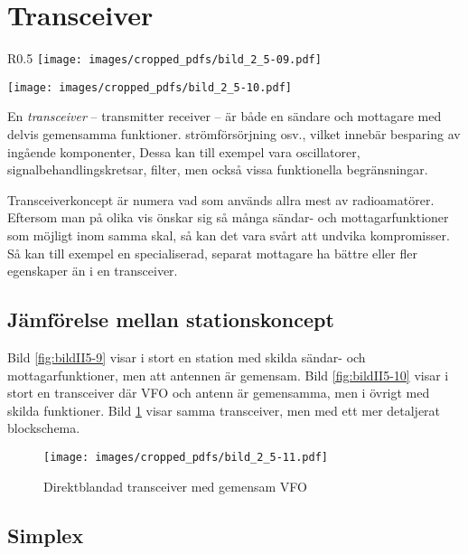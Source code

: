 \section{Transceiver}

\begin{wrapfigure}[26]{R}{0.5\textwidth}
  \texttt{[image: images/cropped\_pdfs/bild\_2\_5-09.pdf]}
  \caption{Separat sändare och mottagare}
  \label{fig:bildII5-9}

  \texttt{[image: images/cropped\_pdfs/bild\_2\_5-10.pdf]}
  \caption{Transceiver med samma VFO}
  \label{fig:bildII5-10}
\end{wrapfigure}

En \emph{transceiver} -- transmitter receiver -- är både en sändare och
mottagare med delvis gemensamma funktioner.
strömförsörjning osv., vilket innebär besparing av ingående komponenter,
Dessa kan till exempel vara oscillatorer, signalbehandlingskretsar, filter,
men också vissa funktionella begränsningar.

Transceiverkoncept är numera vad som används allra mest av radioamatörer.
Eftersom man på olika vis önskar sig så många sändar- och mottagarfunktioner
som möjligt inom samma skal, så kan det vara svårt att undvika kompromisser.
Så kan till exempel en specialiserad, separat mottagare ha bättre eller fler
egenskaper än i en transceiver.

\subsection{Jämförelse mellan stationskoncept}

Bild \ref{fig:bildII5-9} visar i stort en station med skilda sändar- och
mottagarfunktioner, men att antennen är gemensam.
Bild \ref{fig:bildII5-10} visar i stort en transceiver där VFO och antenn är
gemensamma, men i övrigt med skilda funktioner.
Bild \ref{fig:bildII5-11} visar samma transceiver, men med ett mer detaljerat
blockschema.

\begin{figure}
  \texttt{[image: images/cropped\_pdfs/bild\_2\_5-11.pdf]}
  \caption{Direktblandad transceiver med gemensam VFO}
  \label{fig:bildII5-11}
\end{figure}

\subsection{Simplex}

